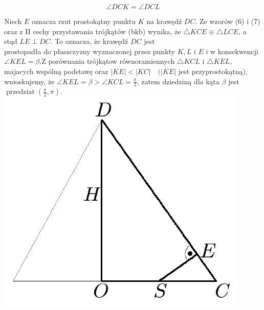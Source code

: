 \documentclass[10pt]{article}
\begin{document}
$$
\angle D C K=\angle D C L
$$

Niech $E$ oznacza rzut prostokątny punktu $K$ na krawędź $D C$. Ze wzorów (6) i (7) oraz z II cechy przystawania trójkątów (bkb) wynika, że $\triangle K C E \equiv \triangle L C E$, a stąd $L E \perp D C$. To oznacza, że krawędź $D C$ jest\\
prostopadła do płaszczyzny wyznaczonej przez punkty $K, L$ i $E$ i w konsekwencji $\angle K E L=\beta . \mathrm{Z}$ porównania trójkątow równoramiennych $\triangle K C L$ i $\triangle K E L$, majacych wspólną podstawę oraz $|K E|<|K C| \quad(|K E|$ jest przyprostokątną), wnioskujemy, że $\angle K E L=\beta>\angle K C L=\frac{\pi}{2}$, zatem dziedziną dla kąta $\beta$ jest $\operatorname{przedziat}\left(\frac{\pi}{2}, \pi\right)$.\\
\includegraphics[max width=\textwidth, center]{2024_11_16_fe5b564401bf7db98894g-124}
\end{document}
